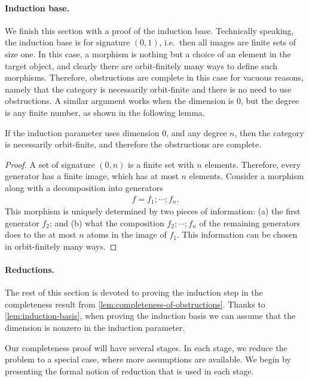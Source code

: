 \paragraph*{Induction base.}
We finish this section with a proof of the induction base. Technically speaking, the induction base is for signature $(0,1)$, i.e.~then all images are finite sets of size one. In this case, a morphism is nothing but a choice of an element in the target object, and clearly there are orbit-finitely many ways to define such morphisms. Therefore, obstructions are complete in this case for vacuous reasons, namely that the category is necessarily orbit-finite and there is no need to use obstructions. 
A similar argument works when the dimension is $0$, but the degree is any finite number, as shown in the following lemma. 
\begin{lemma}\label{lem:induction-basis}
        If the induction parameter uses dimension $0$, and any degree $n$, then the category is necessarily orbit-finite, and therefore the obstructions are complete.
\end{lemma}
\begin{proof}
    A set of signature $(0,n)$ is a finite set with $n$ elements. Therefore, every generator has a finite image, which has at most $n$ elements. Consider a morphism along with a decomposition into generators
    \begin{align*}
     f = f_1; \cdots ; f_n.     
    \end{align*}
    This morphism is uniquely determined by two pieces of information: (a) the first generator $f_2$; and (b) what the composition $f_2;\cdots ; f_n$ of the remaining generators does to the at most $n$ atoms in the image of $f_1$. This information can be chosen in orbit-finitely many ways. 
\end{proof}


\paragraph*{Reductions.}
The rest of this section is devoted to proving the induction step in the completeness result from \cref{lem:completeness-of-obstructions}.
Thanks to \cref{lem:induction-basis}, when proving the induction basis we can assume that the dimension is nonzero in the induction parameter.

Our completeness proof will have several stages. In each stage, we reduce the problem to a special case, where more assumptions are available. We begin by presenting the formal notion of reduction that is used in each stage.

